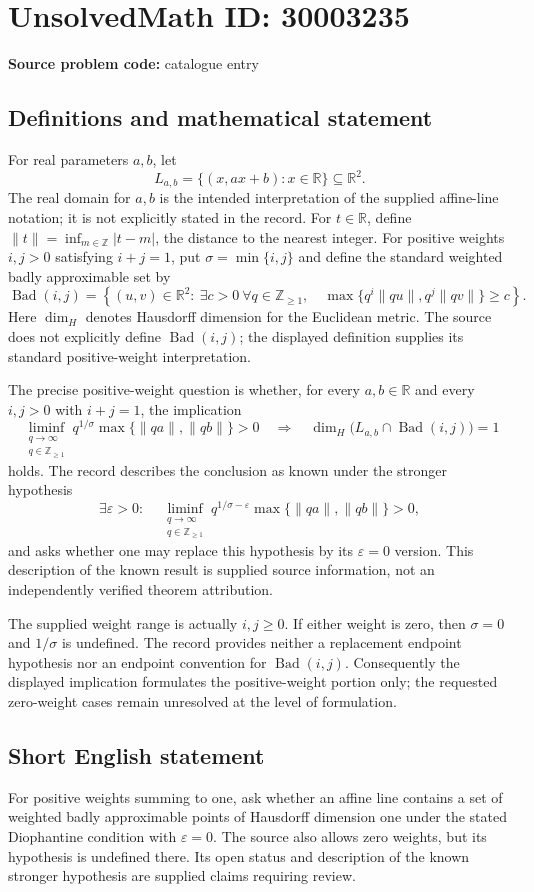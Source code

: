 \documentclass[11pt]{article}
\newcommand{\Z}{\mathbb{Z}}
\newcommand{\R}{\mathbb{R}}
\begin{document}
\section*{UnsolvedMath ID: 30003235}
\textbf{Source problem code:} catalogue entry
\subsection{Definitions and mathematical statement}
For real parameters \(a,b\), let
\[
L_{a,b}=\{(x,ax+b):x\in\R\}\subseteq\R^2.
\]
The real domain for \(a,b\) is the intended interpretation of the supplied affine-line notation; it is not explicitly stated in the record. For \(t\in\R\), define \(\|t\|=\inf_{m\in\Z}|t-m|\), the distance to the nearest integer. For positive weights \(i,j>0\) satisfying \(i+j=1\), put \(\sigma=\min\{i,j\}\) and define the standard weighted badly approximable set by
\[
\operatorname{Bad}(i,j)=\left\{(u,v)\in\R^2:\ \exists c>0\ \forall q\in\Z_{\geq1},\quad
\max\{q^i\|qu\|,q^j\|qv\|\}\geq c\right\}.
\]
Here \(\dim_H\) denotes Hausdorff dimension for the Euclidean metric. The source does not explicitly define \(\operatorname{Bad}(i,j)\); the displayed definition supplies its standard positive-weight interpretation.

The precise positive-weight question is whether, for every \(a,b\in\R\) and every \(i,j>0\) with \(i+j=1\), the implication
\[
\liminf_{\substack{q\to\infty\\q\in\Z_{\geq1}}}
q^{1/\sigma}\max\{\|qa\|,\|qb\|\}>0
\quad\Longrightarrow\quad
\dim_H\bigl(L_{a,b}\cap\operatorname{Bad}(i,j)\bigr)=1
\]
holds. The record describes the conclusion as known under the stronger hypothesis
\[
\exists\varepsilon>0:\quad
\liminf_{\substack{q\to\infty\\q\in\Z_{\geq1}}}
q^{1/\sigma-\varepsilon}\max\{\|qa\|,\|qb\|\}>0,
\]
and asks whether one may replace this hypothesis by its \(\varepsilon=0\) version. This description of the known result is supplied source information, not an independently verified theorem attribution.

The supplied weight range is actually \(i,j\geq0\). If either weight is zero, then \(\sigma=0\) and \(1/\sigma\) is undefined. The record provides neither a replacement endpoint hypothesis nor an endpoint convention for \(\operatorname{Bad}(i,j)\). Consequently the displayed implication formulates the positive-weight portion only; the requested zero-weight cases remain unresolved at the level of formulation.
\subsection{Short English statement}
For positive weights summing to one, ask whether an affine line contains a set of weighted badly approximable points of Hausdorff dimension one under the stated Diophantine condition with \(\varepsilon=0\). The source also allows zero weights, but its hypothesis is undefined there. Its open status and description of the known stronger hypothesis are supplied claims requiring review.
\end{document}
